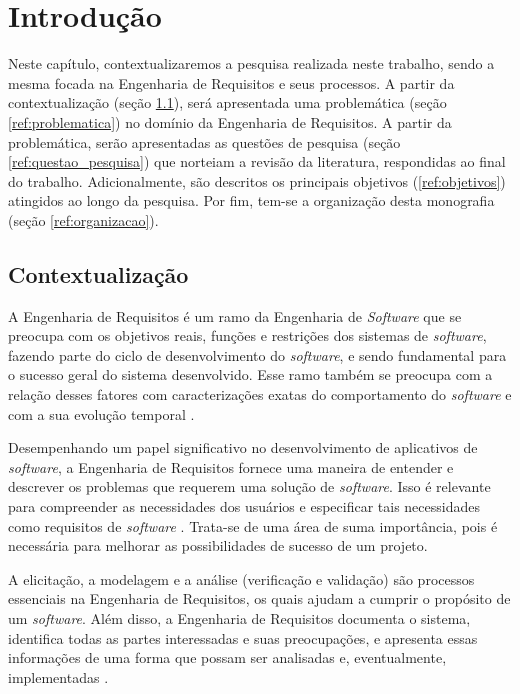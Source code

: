 \chapter[Introdução]{Introdução}

Neste capítulo, contextualizaremos a pesquisa realizada neste trabalho, sendo a mesma focada na Engenharia de Requisitos e seus processos. A partir da contextualização (seção \ref{ref:contextualizacao}), será apresentada uma problemática (seção \ref{ref:problematica}) no domínio da Engenharia de Requisitos. A partir da problemática, serão apresentadas as questões de pesquisa (seção \ref{ref:questao_pesquisa}) que norteiam a revisão da literatura, respondidas ao final do trabalho. Adicionalmente, são descritos os principais objetivos (\ref{ref:objetivos}) atingidos ao longo da pesquisa. Por fim, tem-se a organização desta monografia (seção \ref{ref:organizacao}).

\label{chap:intro}

\section{Contextualização}

\label{ref:contextualizacao}

A Engenharia de Requisitos é um ramo da Engenharia de \textit{Software} que se preocupa com os objetivos reais, funções e restrições dos sistemas de \textit{software}, fazendo parte do ciclo de desenvolvimento do \textit{software}, e sendo fundamental para o sucesso geral do sistema desenvolvido. Esse ramo também se preocupa com a relação desses fatores com caracterizações exatas do comportamento do \textit{software} e com a sua evolução temporal \cite{elliott2012software}.

Desempenhando um papel significativo no desenvolvimento de aplicativos de \textit{software}, a Engenharia de Requisitos fornece uma maneira de entender e descrever os problemas que requerem uma solução de \textit{software}. Isso é relevante para compreender as necessidades dos usuários e especificar tais necessidades como requisitos de \textit{software} \cite{elliott2012software}. Trata-se de uma área de suma importância, pois é necessária para melhorar as possibilidades de sucesso de um projeto.

A elicitação, a modelagem e a análise (verificação e validação) são processos essenciais na Engenharia de Requisitos, os quais ajudam a cumprir o propósito de um \textit{software}. Além disso, a Engenharia de Requisitos documenta o sistema, identifica todas as partes interessadas e suas preocupações, e apresenta essas informações de uma forma que possam ser analisadas e, eventualmente, implementadas \cite{elliott2012software}.

